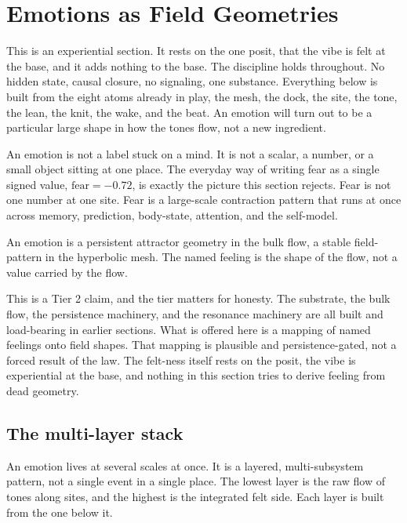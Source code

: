 \section{Emotions as Field Geometries}

This is an experiential section. It rests on the one posit, that the vibe is felt at the base, and it adds nothing to the base. The discipline holds throughout. No hidden state, causal closure, no signaling, one substance. Everything below is built from the eight atoms already in play, the mesh, the dock, the site, the tone, the lean, the knit, the wake, and the beat. An emotion will turn out to be a particular large shape in how the tones flow, not a new ingredient.

An emotion is not a label stuck on a mind. It is not a scalar, a number, or a small object sitting at one place. The everyday way of writing fear as a single signed value, $\mathrm{fear} = -0.72$, is exactly the picture this section rejects. Fear is not one number at one site. Fear is a large-scale contraction pattern that runs at once across memory, prediction, body-state, attention, and the self-model.

\begin{principle}
An emotion is a persistent attractor geometry in the bulk flow, a stable field-pattern in the hyperbolic mesh. The named feeling is the shape of the flow, not a value carried by the flow.
\end{principle}

This is a Tier 2 claim, and the tier matters for honesty. The substrate, the bulk flow, the persistence machinery, and the resonance machinery are all built and load-bearing in earlier sections. What is offered here is a mapping of named feelings onto field shapes. That mapping is plausible and persistence-gated, not a forced result of the law. The felt-ness itself rests on the posit, the vibe is experiential at the base, and nothing in this section tries to derive feeling from dead geometry.

\subsection{The multi-layer stack}

An emotion lives at several scales at once. It is a layered, multi-subsystem pattern, not a single event in a single place. The lowest layer is the raw flow of tones along sites, and the highest is the integrated felt side. Each layer is built from the one below it.

